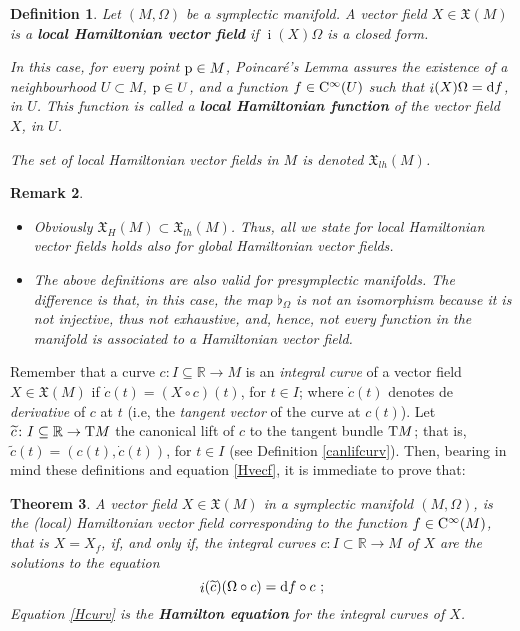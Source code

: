 \documentclass[12pt]{report}
\newtheorem{teor}{Theorem}[chapter]
\newtheorem{definition}[teor]{Definition}
\newtheorem{remark}[teor]{Remark}
\def\eeq{\end{equation}}
\def\bit{\begin{itemize}}
\def\eit{\end{itemize}}
\def\vf{\mathfrak X}
\def\d{{\rm d}}
\def\Real{\mathbb{R}}
\def\Tan{{\rm T}}
\def\inn{\mathop{i}\nolimits}
\def\Cinfty{{\rm C}^\infty}
\begin{document}
\begin{definition}
\label{locHvf}
Let $(M,\Omega )$ be a symplectic manifold. A vector field
$X \in \vf (M)$ is a \textbf{local Hamiltonian vector field} if
$\inn(X)\Omega$ is a closed form.

In this case, for every point ${\rm p} \in M$, Poincar\'e's Lemma assures 
the existence of a neighbourhood $U \subset M$, ${\rm p}\in U$,  and a function
$f \in \Cinfty (U)$ such that $\inn(X)\Omega = \d f$, in $U$.
This function is called a \textbf{local Hamiltonian function}
of the vector field $X$, in $U$.

The set of local Hamiltonian vector fields in $M$ is denoted $\vf_{lh} (M)$.
\end{definition}

\begin{remark}{\rm 
\bit
\item
Obviously $\vf_H (M) \subset \vf_{lh} (M)$.
Thus, all we state for local Hamiltonian vector fields
holds also for global Hamiltonian vector fields.
\item
The above definitions are also valid for presymplectic manifolds. 
The difference is that, in this case, the map $\flat_\Omega$
is not an isomorphism because it is not injective, thus not exhaustive, and, hence,
not every function in the manifold is associated to a Hamiltonian vector field.
\eit
}\end{remark}

Remember that a curve $c\colon I\subseteq\Real\to M$ is an {\sl integral curve}
of a vector field $X\in\vf(M)$ if $\dot c(t)=(X\circ c)(t)$, for $t\in I$;
where $\dot c(t)$ denotes de {\sl derivative} of $c$ at $t$
(i.e, the {\sl tangent vector} of the curve at $c(t)$).
Let $\widetilde c\colon I\subseteq\Real\to\Tan M$ the canonical lift of $c$
to the tangent bundle $\Tan M$; that is, $\widetilde c(t)=(c(t),\dot c(t))$,
for $t\in I$ (see Definition \ref{canlifcurv}).
Then, bearing in mind these definitions and equation  \eqref{Hvecf},
it is immediate to prove that:

\begin{teor}
\label{teo:Hcurv}
A vector field  $X\in\vf(M)$ in a symplectic manifold $(M,\Omega)$, is the (local) Hamiltonian vector field corresponding to the function $f \in \Cinfty (M)$, that is $X=X_{f}$, if, and only if,
the integral curves $c\colon I\subset\Real\to M$ of $X$ are the solutions to the equation
 \begin{equation}
\label{Hcurv}
\inn( \widetilde c)(\Omega\circ c)=\d f\circ c \ ;
\eeq
Equation \eqref{Hcurv} is the {\sl \textbf{Hamilton equation}} for the
integral curves of $X$.
\end{teor}
\end{document}
